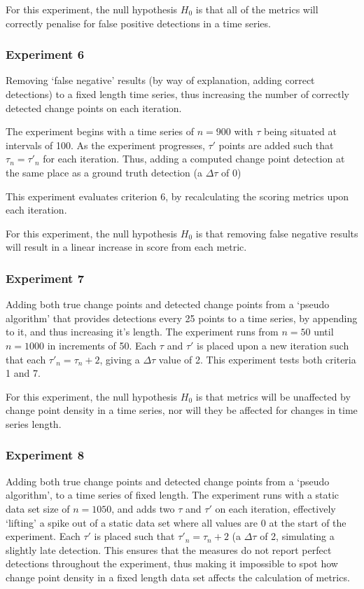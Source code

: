 \documentclass{uvamscse}	%
\begin{document}
For this experiment, the null hypothesis $H_0$ is that all of the metrics will correctly penalise for false positive detections in a time series.

\subsubsection{Experiment 6}

Removing `false negative' results (by way of explanation, adding correct detections) to a fixed length time series, thus increasing the number of correctly detected change points on each iteration.

The experiment begins with a time series of $n=900$ with $\tau$ being situated at intervals of 100. As the experiment progresses, $\tau'$ points are added such that $\tau_n = \tau'_n$ for each iteration. Thus, adding a computed change point detection at the same place as a ground truth detection (a $\Delta \tau$ of 0)

This experiment evaluates criterion 6, by recalculating the scoring metrics upon each iteration.

For this experiment, the null hypothesis $H_0$ is that removing false negative results will result in a linear increase in score from each metric.

\subsubsection{Experiment 7}

Adding both true change points and detected change points from a `pseudo algorithm' that provides detections every 25 points to a time series, by appending to it, and thus increasing it's length. The experiment runs from $n=50$ until $n=1000$ in increments of 50. Each $\tau$ and $\tau'$ is placed upon a new iteration such that each $\tau'_n = \tau_n + 2$, giving a $\Delta \tau$ value of 2. This experiment tests both criteria 1 and 7.

For this experiment, the null hypothesis $H_0$ is that metrics will be unaffected by change point density in a time series, nor will they be affected for changes in time series length.

\subsubsection{Experiment 8}

Adding both true change points and detected change points from a `pseudo algorithm', to a time series of fixed length. The experiment runs with a static data set size of $n=1050$, and adds two $\tau$ and $\tau'$ on each iteration, effectively `lifting' a spike out of a static data set where all values are 0 at the start of the experiment. Each $\tau'$ is placed such that $\tau'_n = \tau_n + 2$ (a $\Delta \tau$ of 2, simulating a slightly late detection. This ensures that the measures do not report perfect detections throughout the experiment, thus making it impossible to spot how change point density in a fixed length data set affects the calculation of metrics.
\end{document}
